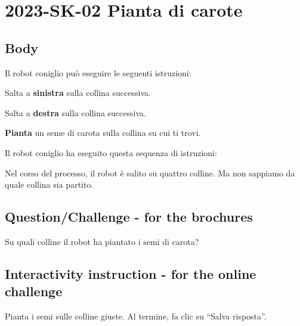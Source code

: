 \documentclass[a4paper,11pt]{report}
\newcommand{\taskGraphicsFolder}{..}
\begin{document}
\section*{\centering{} 2023-SK-02 Pianta di carote}


\subsection*{Body}

Il robot coniglio può eseguire le seguenti istruzioni:

\raisebox{-0.5ex}{} Salta a \textbf{sinistra} sulla collina successiva.

\raisebox{-0.5ex}{} Salta a \textbf{destra} sulla collina successiva.

\raisebox{-0.5ex}{} \textbf{Pianta} un seme di carota sulla collina su cui ti trovi.

Il robot coniglio ha eseguito questa sequenza di istruzioni:

{\centering%
\par}

Nel corso del processo, il robot è salito su quattro colline.
Ma non sappiamo da quale collina sia partito.

{\em


\subsection*{Question/Challenge - for the brochures}

Su quali colline il robot ha piantato i semi di carota?

{\centering%
\par}

}


\subsection*{Interactivity instruction - for the online challenge}

Pianta i semi sulle colline giuste. Al termine, fa clic su \enquote{Salva risposta}.

\begingroup
\renewcommand{\arraystretch}{1.5}
\end{document}
